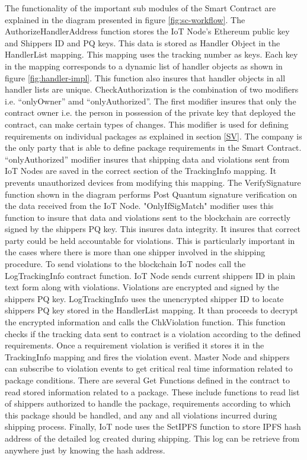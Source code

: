 The functionality of the important sub modules of the Smart Contract are explained in the diagram presented in figure \ref{fig:sc-workflow}. The AuthorizeHandlerAddress function stores the IoT Node’s Ethereum public key and Shippers ID and PQ keys. This data is stored as Handler Object in the HandlerList mapping. This mapping uses the tracking number as keys. Each key in the mapping corresponds to a dynamic list of handler objects as shown in figure \ref{fig:handler-impl}. This function also insures that handler objects in all handler lists are unique. CheckAuthorization is the combination of two modifiers i.e. “onlyOwner” amd “onlyAuthorized”. The first modifier insures that only the contract owner i.e. the person in possession of the private key that deployed the contract, can make certain types of changes. This modifier is used for defining requirements on individual packages as explained in section \ref{SV}. The company is the only party that is able to define package requirements in the Smart Contract. “onlyAuthorized” modifier insures that shipping data and violations sent from IoT Nodes are saved in the correct section of the TrackingInfo mapping. It prevents unauthorized devices from modifying this mapping. The VerifySignature function shown in the diagram performs Post Quantum signature verification on the data received from the IoT Node. "OnlyIfSigMatch" modifier uses this function to insure that data and violations sent to the blockchain are correctly signed by the shippers PQ key. This insures data integrity. It insures that correct party could be held accountable for violations. This is particularly important in the cases where there is more than one shipper involved in the shipping procedure. To send violations to the blockchain IoT nodes call the LogTrackingInfo contract function. IoT Node sends current shippers ID in plain text form along with violations. Violations are encrypted and signed by the shippers PQ key. LogTrackingInfo uses the unencrypted shipper ID to locate shippers PQ key stored in the HandlerList mapping. It than proceeds to decrypt the encrypted information and calls the ChkViolation function. This function checks if the tracking data sent to contract is a violation according to the defined requirements. Once a requirement violation is verified it stores it in the TrackingInfo mapping and fires the violation event. Master Node and shippers can subscribe to violation events to get critical real time information related to package conditions. There are several Get Functions defined in the contract to read stored information related to a package. These include functions to read list of shippers authorized to handle the package, requirements according to which this package should be handled, and any and all violations incurred during shipping process. Finally, IoT node uses the SetIPFS function to store IPFS hash address of the detailed log created during shipping. This log can be retrieve from anywhere just by knowing the hash address.      
